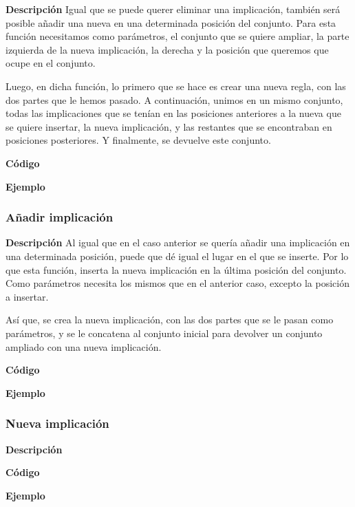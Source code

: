     \textbf{Descripci\'on}
    Igual que se puede querer eliminar una implicaci\'on, tambi\'en ser\'a posible a\~nadir una nueva en una determinada posici\'on 
    del conjunto. Para esta funci\'on necesitamos como par\'ametros, el conjunto que se quiere ampliar, la parte izquierda de la nueva 
    implicaci\'on, la derecha y la posici\'on que queremos que ocupe en el conjunto.

    Luego, en dicha funci\'on, lo primero que se hace es crear una nueva regla, con las dos partes que le hemos pasado. A continuaci\'on, 
    unimos en un mismo conjunto, todas las implicaciones que se ten\'ian en las posiciones anteriores a la nueva que se quiere insertar, 
    la nueva implicaci\'on, y las restantes que se encontraban en posiciones posteriores. Y finalmente, se devuelve este conjunto.


    \textbf{C\'odigo}


    \textbf{Ejemplo}



\subsubsection{A\~nadir implicaci\'on}

    \textbf{Descripci\'on}
    Al igual que en el caso anterior se quer\'ia a\~nadir una implicaci\'on en una determinada posici\'on, puede que d\'e igual 
    el lugar en el que se inserte. Por lo que esta funci\'on, inserta la nueva implicaci\'on en la \'ultima posici\'on del 
    conjunto. Como par\'ametros necesita los mismos que en el anterior caso, excepto la posici\'on a insertar.

    As\'i que, se crea la nueva implicaci\'on, con las dos partes que se le pasan como par\'ametros, y se le concatena al conjunto 
    inicial para devolver un conjunto ampliado con una nueva implicaci\'on.

    \textbf{C\'odigo}


    \textbf{Ejemplo}



\subsubsection{Nueva implicaci\'on}

    \textbf{Descripci\'on}


    \textbf{C\'odigo}


    \textbf{Ejemplo}


